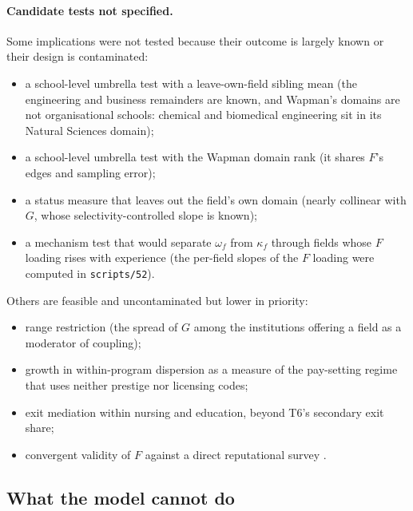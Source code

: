 \documentclass[11pt]{article}
\begin{document}
\paragraph{Candidate tests not specified.} Some implications were not tested because their outcome is largely
known or their design is contaminated:
\begin{itemize}
\item a school-level umbrella test with a leave-own-field sibling mean (the engineering and business remainders are
known, and Wapman's domains are not organisational schools: chemical and biomedical engineering sit in its Natural
Sciences domain);
\item a school-level umbrella test with the Wapman domain rank (it shares $F$'s edges and sampling error);
\item a status measure that leaves out the field's own domain (nearly collinear with $G$, whose
selectivity-controlled slope is known);
\item a mechanism test that would separate $\omega_f$ from $\kappa_f$ through fields whose $F$ loading rises with
experience (the per-field slopes of the $F$ loading were computed in \texttt{scripts/52}).
\end{itemize}
Others are feasible and uncontaminated but lower in priority:
\begin{itemize}
\item range restriction (the spread of $G$ among the institutions offering a field as a moderator of coupling);
\item growth in within-program dispersion as a measure of the pay-setting regime that uses neither prestige nor
licensing codes;
\item exit mediation within nursing and education, beyond T6's secondary exit share;
\item convergent validity of $F$ against a direct reputational survey \citep{nrc1995research}.
\end{itemize}

\subsection{What the model cannot do}\label{si:theory:limits}
\end{document}
